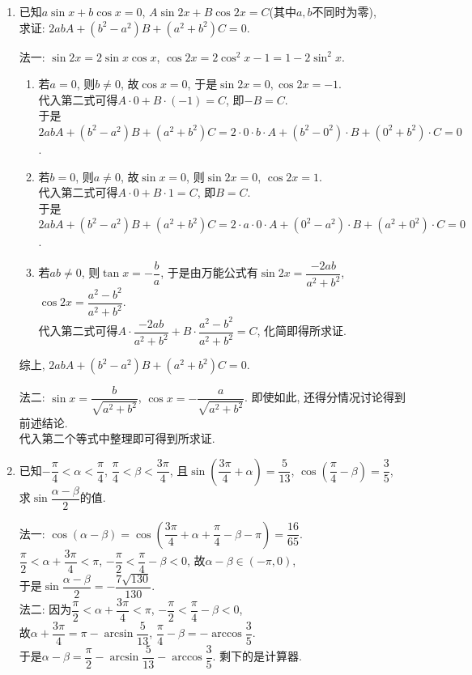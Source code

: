 \begin{enumerate}
\item 已知$a\sin{x}+b\cos{x}=0$, $A\sin2x+B\cos2x=C$(其中$a,b$不同时为零), \\
求证: $2abA+(b^2-a^2)B+(a^2+b^2)C=0$. 
\begin{jieda}
法一: $\sin2x=2\sin{x}\cos{x}$, $\cos2x=2\cos^2{x}-1=1-2\sin^2x$. 
\begin{enumerate}[(1)]
\item 若$a=0$, 则$b\neq 0$, 故$\cos{x}=0$, 于是$\sin2x=0,\cos2x=-1$. \\
代入第二式可得$A\cdot 0+B\cdot(-1)=C$, 即$-B=C$. \\
于是$2abA+(b^2-a^2)B+(a^2+b^2)C=2\cdot0\cdot b\cdot A+(b^2-0^2)\cdot B+(0^2+b^2)\cdot C=0$. 

\item 若$b=0$, 则$a\neq 0$, 故$\sin{x}=0$, 则$\sin2x=0$, $\cos2x=1$. \\
代入第二式可得$A\cdot0+B\cdot1=C$, 即$B=C$. \\
于是$2abA+(b^2-a^2)B+(a^2+b^2)C=2\cdot a\cdot0\cdot A+(0^2-a^2)\cdot B+(a^2+0^2)\cdot C=0$. 

\item 若$ab\neq 0$, 则$\tan{x}=-\dfrac{b}{a}$, 于是由万能公式有$\sin2x=\dfrac{-2ab}{a^2+b^2}$, $\cos2x=\dfrac{a^2-b^2}{a^2+b^2}$. \\
代入第二式可得$A\cdot\dfrac{-2ab}{a^2+b^2}+B\cdot\dfrac{a^2-b^2}{a^2+b^2}=C$, 化简即得所求证. 
\end{enumerate}
综上, $2abA+(b^2-a^2)B+(a^2+b^2)C=0$. 

法二: $\sin{x}=\dfrac{b}{\sqrt{a^2+b^2}}$, $\cos{x}=-\dfrac{a}{\sqrt{a^2+b^2}}$. 即使如此, 还得分情况讨论得到前述结论. \\
代入第二个等式中整理即可得到所求证. 
\end{jieda}

\item 已知$-\dfrac{\pi}{4}<\alpha<\dfrac{\pi}{4}$, $\dfrac{\pi}{4}<\beta<\dfrac{3\pi}{4}$, 
且$\sin\left(\dfrac{3\pi}{4}+\alpha\right)=\dfrac{5}{13}$, $\cos\left(\dfrac{\pi}{4}-\beta\right)=\dfrac{3}{5}$, 
求$\sin\dfrac{\alpha-\beta}{2}$的值. 
\begin{jieda}
法一: $\cos(\alpha-\beta)=\cos\left(\dfrac{3\pi}{4}+\alpha+\dfrac{\pi}{4}-\beta-\pi\right)=\dfrac{16}{65}$. \\
$\dfrac{\pi}{2}<\alpha+\dfrac{3\pi}{4}<\pi$, $-\dfrac{\pi}{2}<\dfrac{\pi}{4}-\beta<0$, 故$\alpha-\beta\in(-\pi,0)$, \\
于是$\sin\dfrac{\alpha-\beta}{2}=-\dfrac{7\sqrt{130}}{130}$. \\
法二: 因为$\dfrac{\pi}{2}<\alpha+\dfrac{3\pi}{4}<\pi$, $-\dfrac{\pi}{2}<\dfrac{\pi}{4}-\beta<0$, \\
故$\alpha+\dfrac{3\pi}{4}=\pi-\arcsin\dfrac{5}{13}$, $\dfrac{\pi}{4}-\beta=-\arccos\dfrac{3}{5}$. \\
于是$\alpha-\beta=\dfrac{\pi}{2}-\arcsin\dfrac{5}{13}-\arccos\dfrac{3}{5}$. 剩下的是计算器. 
\end{jieda}


\end{enumerate}
